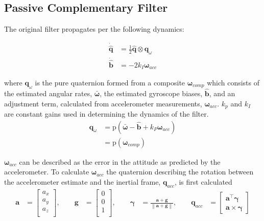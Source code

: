 \documentclass[paper=a4, fontsize=11pt]{scrartcl} %
\numberwithin{equation}{section} %
\numberwithin{figure}{section} %
\numberwithin{table}{section} %
\begin{document}
\subsection{Passive Complementary Filter}
The original filter propagates per the following dynamics:

\newcommand{\wacc}{\bm{\omega}_{acc}}
\begin{equation}
	\begin{aligned}
	\bm{\dot{\hat{q}}} &= \frac{1}{2} \bm{\hat{q}} \otimes \bm{q}_{\omega}\\
	\bm{\dot{\hat{b}}} &= -2k_I\wacc
	\end{aligned}
	\label{eq:traditional_prop}
\end{equation}


where $\bm{q}_{\omega}$ is the pure quaternion formed from a composite $\bm{\omega}_{comp}$ which consists of the estimated angular rates, $\bar{\bm{\omega}}$, the estimated gyroscope biases, $\hat{\bm{b}}$, and an adjustment term, calculated from accelerometer measurements, $\bm{\omega}_{acc}$. $k_p$ and $k_I$ are constant gains used in determining the dynamics of the filter.
\begin{equation}
\begin{aligned}
	\bm{q}_{\omega} &= \textrm{p}\left(\bar{\bm{\omega}} - \hat{\bm{b}} + k_P\wacc\right) \\
	&= \textrm{p}\left( \bm{\omega}_{comp} \right)
	\label{eq:q_omega}
\end{aligned}
\end{equation}

\newcommand{\avec}{\bm{a}}
\newcommand{\gvec}{\bm{g}}
\newcommand{\qmeas}{\bm{q}_{acc}}
\newcommand{\gamvec}{\bm{\gamma}}
\newcommand{\norm}[1]{\left\lVert#1\right\rVert}
\newcommand{\wbar}{\bm{\bar{\omega}}}
\newcommand{\w}{\bm{\omega}}
\newcommand{\qhat}{\hat{\bm{q}}}

$\wacc$ can be described as the error in the attitude as predicted by the accelerometer.  To calculate $\wacc$ the quaternion describing the rotation between the accelerometer estimate and the inertial frame, $\qmeas$, is first calculated
\begin{equation}
\begin{aligned}
	\avec &=
		\begin{bmatrix}
			a_x \\
			a_y \\
			a_z \\
			\end{bmatrix},
	\qquad
	\gvec &=
	  \begin{bmatrix}
			0 \\
			0 \\
			1 \\
		\end{bmatrix}, \qquad
	\gamvec &= \frac{\avec+\gvec}{\norm{\avec+\gvec}}, \qquad
	\qmeas &=
	  \begin{bmatrix}
	    \avec^\top \gamvec \\
	    \avec \times \gamvec
	  \end{bmatrix}
\end{aligned}
\end{equation}
\end{document}
